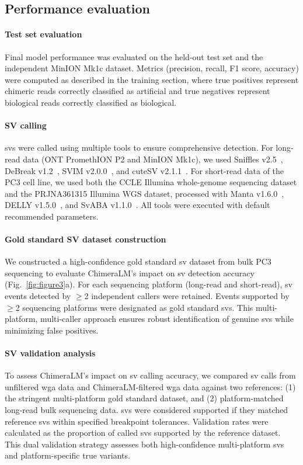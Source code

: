 \documentclass[pdflatex,sn-nature,lineno]{sn-jnl}%
\theoremstyle{thmstyleone}%
\theoremstyle{thmstyletwo}%
\theoremstyle{thmstylethree}%
\begin{document}
\subsection*{Performance evaluation}

\paragraph{Test set evaluation}
Final model performance was evaluated on the held-out test set and the independent MinION Mk1c dataset. Metrics (precision, recall, F1 score, accuracy) were computed as described in the training section, where true positives represent chimeric reads correctly classified as artificial and true negatives represent biological reads correctly classified as biological.

\paragraph{SV calling}
\glspl{sv} were called using multiple tools to ensure comprehensive detection. For long-read data (ONT PromethION P2 and MinION Mk1c), we used Sniffles v2.5~\cite{Sedlazeck2018, Smolka2024}, DeBreak v1.2~\cite{chen2023deciphering}, SVIM v2.0.0~\cite{heller2019svim}, and cuteSV v2.1.1~\cite{jiang2020longreadbased}. For short-read data of the PC3 cell line, we used both the CCLE Illumina whole-genome sequencing dataset and the PRJNA361315 Illumina WGS dataset, processed with Manta v1.6.0~\cite{chen2016manta}, DELLY v1.5.0~\cite{rausch2012delly}, and SvABA v1.1.0~\cite{wala2018svaba}. All tools were executed with default recommended parameters.

\paragraph{Gold standard SV dataset construction}
We constructed a high-confidence gold standard \gls{sv} dataset from bulk PC3 sequencing to evaluate ChimeraLM's impact on \gls{sv} detection accuracy (Fig.~\ref{fig:figure3}a).
For each sequencing platform (long-read and short-read), \gls{sv} events detected by $\geq$2 independent callers were retained.
Events supported by $\geq$2 sequencing platforms were designated as gold standard \glspl{sv}.
This multi-platform, multi-caller approach ensures robust identification of genuine \glspl{sv} while minimizing false positives.

\paragraph{SV validation analysis}
To assess ChimeraLM's impact on \gls{sv} calling accuracy, we compared \gls{sv} calls from unfiltered \gls{wga} data and ChimeraLM-filtered \gls{wga} data against two references: (1) the stringent multi-platform gold standard dataset, and (2) platform-matched long-read bulk sequencing data. \glspl{sv} were considered supported if they matched reference \glspl{sv} within specified breakpoint tolerances. Validation rates were calculated as the proportion of called \glspl{sv} supported by the reference dataset.
This dual validation strategy assesses both high-confidence multi-platform \glspl{sv} and platform-specific true variants.
\end{document}
